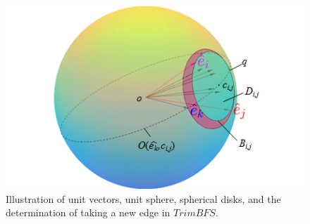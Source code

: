 \begin{figure}[tbp]
  \centering
  \includegraphics[width=\linewidth]{figs/take_arc.png}
  \caption{\label{fig:sphere}%
           Illustration of unit vectors, unit sphere, spherical disks, and the determination of taking a new edge in $TrimBFS$.}
\end{figure}

